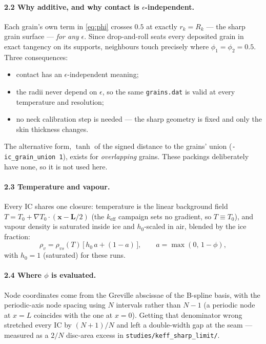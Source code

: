 \documentclass[11pt]{article}
\newcommand{\code}[1]{\texttt{\small #1}}
\begin{document}
\paragraph{2.2 Why additive, and why contact is $\epsilon$-independent.}
Each grain's own term in \eqref{eq:phi} crosses $0.5$ at exactly
$r_k = R_k$ --- the sharp grain surface --- \emph{for any} $\epsilon$. Since
drop-and-roll seats every deposited grain in exact tangency on its
supports, neighbours touch precisely where $\phi_1 = \phi_2 = 0.5$.
Three consequences:
%
\begin{itemize}\itemsep2pt
  \item contact has an $\epsilon$-independent meaning;
  \item the radii never depend on $\epsilon$, so the same
        \code{grains.dat} is valid at every temperature and resolution;
  \item no neck calibration step is needed --- the sharp geometry is fixed
        and only the skin thickness changes.
\end{itemize}
%
The alternative form, $\tanh$ of the signed distance to the grains' union
(\code{-ic\_grain\_union 1}), exists for \emph{overlapping} grains. These
packings deliberately have none, so it is not used here.

\paragraph{2.3 Temperature and vapour.}
Every IC shares one closure: temperature is the linear background field
$T = T_0 + \nabla T_0 \cdot (\mathbf{x} - \mathbf{L}/2)$ (the
$k_{\text{eff}}$ campaign sets no gradient, so $T \equiv T_0$), and vapour
density is saturated inside ice and $h_0$-scaled in air, blended by the
ice fraction:
%
\begin{equation}
  \rho_v = \rho_{vs}(T)\,\big[\,h_0\,a + (1-a)\,\big],
  \qquad a = \max(0,\,1-\phi),
\end{equation}
%
with $h_0 = 1$ (saturated) for these runs.

\paragraph{2.4 Where $\phi$ is evaluated.}
Node coordinates come from the Greville abscissae of the B-spline basis,
with the periodic-axis node spacing using $N$ intervals rather than $N-1$
(a periodic node at $x=L$ coincides with the one at $x=0$). Getting that
denominator wrong stretched every IC by $(N+1)/N$ and left a double-width
gap at the seam --- measured as a $2/N$ disc-area excess in
\code{studies/keff\_sharp\_limit/}.
\end{document}

